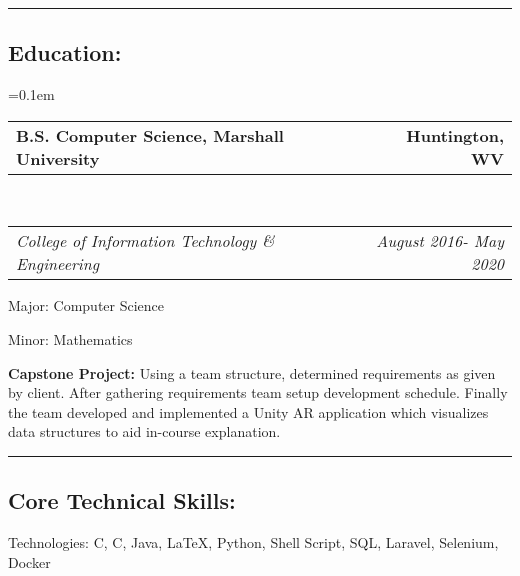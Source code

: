 \documentclass[11pt,letterpaper]{article}
\makeatletter
\newenvironment{indentsection}[1]%
{\begin{list}{}%
	{\setlength{\leftmargin}{#1}}%
	\item[]%
}
{\end{list}}
\newcommand{\headerrow}[2]
{\begin{tabular*}{\linewidth}{l@{\extracolsep{\fill}}r}
	#1 &
	#2 \\
\end{tabular*}}
\newcommand{\CPP}
{C\nolinebreak[4]\hspace{-.05em}\raisebox{.22ex}{\footnotesize\bf ++}}
\makeatother
\begin{document}


\hrule
\vspace{-0.4em}
\subsection*{\Large{Education:}}

	\parskip=0.1em

	\headerrow
		{\textbf{B.S. Computer Science, Marshall University}}
		{\textbf{Huntington, WV}}
	\\
	\headerrow
		{\emph{College of Information Technology \& Engineering}}
		{\emph{August 2016- May 2020}}
	\begin{itemize*}
		\item Major: Computer Science
		\item Minor: Mathematics
	\end{itemize*}
	\begin{description*}
	\item[\textbf{Capstone Project:}] 
	Using a team structure, determined requirements as given by client. After gathering requirements team setup development schedule. Finally the team developed and implemented a Unity AR application which visualizes data structures to aid in-course explanation.
	
	\end{description*}


\hrule
\vspace{-0.4em}
\subsection*{\Large{Core Technical Skills:}}

\begin{indentsection}{\parindent}
\begin{description*}
	\item[Technologies:]
	C, \CPP, Java, \LaTeX, Python, Shell Script, SQL, Laravel, Selenium, Docker
\end{description*}
\end{indentsection}
\end{document}
